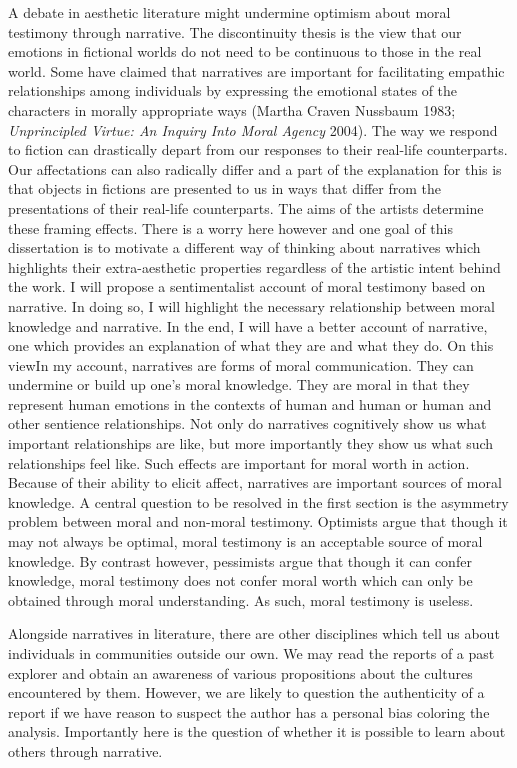 \documentclass[12pt]{book}
\theoremstyle{definition}
\theoremstyle{remark}
\begin{document}
A debate in aesthetic literature might undermine optimism about moral testimony through narrative. The discontinuity thesis is the view that our emotions in fictional worlds do not need to be continuous to those in the real world. Some have claimed that narratives are important for facilitating empathic relationships among individuals by expressing the emotional states of the characters in morally appropriate ways (Martha Craven Nussbaum 1983; \emph{Unprincipled {Virtue}: {An Inquiry Into Moral Agency}} 2004). The way we respond to fiction can drastically depart from our responses to their real-life counterparts. Our affectations can also radically differ and a part of the explanation for this is that objects in fictions are presented to us in ways that differ from the presentations of their real-life counterparts. The aims of the artists determine these framing effects. There is a worry here however and one goal of this dissertation is to motivate a different way of thinking about narratives which highlights their extra-aesthetic properties regardless of the artistic intent behind the work. I will propose a sentimentalist account of moral testimony based on narrative. In doing so, I will highlight the necessary relationship between moral knowledge and narrative. In the end, I will have a better account of narrative, one which provides an explanation of what they are and what they do. On this viewIn my account, narratives are forms of moral communication. They can undermine or build up one's moral knowledge. They are moral in that they represent human emotions in the contexts of human and human or human and other sentience relationships. Not only do narratives cognitively show us what important relationships are like, but more importantly they show us what such relationships feel like. Such effects are important for moral worth in action. Because of their ability to elicit affect, narratives are important sources of moral knowledge. A central question to be resolved in the first section is the asymmetry problem between moral and non-moral testimony. Optimists argue that though it may not always be optimal, moral testimony is an acceptable source of moral knowledge. By contrast however, pessimists argue that though it can confer knowledge, moral testimony does not confer moral worth which can only be obtained through moral understanding. As such, moral testimony is useless.

Alongside narratives in literature, there are other disciplines which tell us about individuals in communities outside our own. We may read the reports of a past explorer and obtain an awareness of various propositions about the cultures encountered by them. However, we are likely to question the authenticity of a report if we have reason to suspect the author has a personal bias coloring the analysis. Importantly here is the question of whether it is possible to learn about others through narrative.
\end{document}
